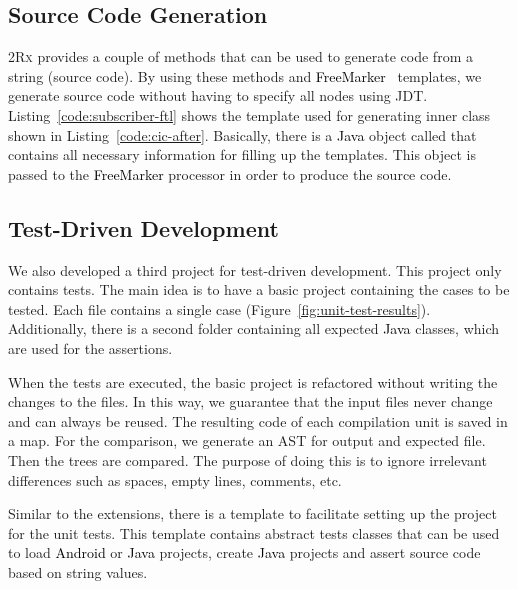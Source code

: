 \documentclass[type=bsc,accentcolor=tud9c]{tudthesis}
\newcommand{\framework}[1]{\textcolor{black}{#1}}
\newcommand{\toolcore}{\textsc{2Rx}}
\begin{document}


\subsection{Source Code Generation}
\toolcore{} provides a couple of methods that can be used to generate code from a string (source code). By using these methods and \framework{FreeMarker}~\cite{freeMarker} templates, we generate source code without having to specify all nodes using JDT. Listing~\ref{code:subscriber-ftl} shows the template used for generating inner class  shown in Listing~\ref{code:cic-after}. Basically, there is a \framework{Java} object called  that contains all necessary information for filling up the templates. This object is passed to the \framework{FreeMarker} processor in order to produce the source code.



\subsection{Test-Driven Development}
We also developed a third project for test-driven development. This project only contains tests. The main idea is to have a basic project containing the cases to be tested. Each file contains a single case (Figure~\ref{fig:unit-test-results}). Additionally, there is a second folder containing all expected \framework{Java} classes, which are used for the assertions.

When the tests are executed, the basic project is refactored without writing the changes to the files. In this way, we guarantee that the input files never change and can always be reused. The resulting code of each compilation unit is saved in a map. For the comparison, we generate an AST for output and expected file. Then the trees are compared. The purpose of doing this is to ignore irrelevant differences such as spaces, empty lines, comments, etc.

Similar to the extensions, there is a template to facilitate setting up the project for the unit tests. This template contains abstract tests classes that can be used to load \framework{Android} or \framework{Java} projects, create \framework{Java} projects and assert source code based on string values.
\end{document}
